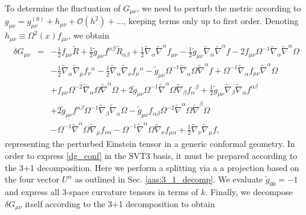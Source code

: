 To determine the fluctuation of $G_{\mu\nu}$, we need to perturb the metric according to $g_{\mu\nu} = g^{(0)}_{\mu\nu} + h_{\mu\nu} + \mathcal O(h^2)+ ...$, keeping terms only up to first order. Denoting $h_{\mu\nu} \equiv \Omega^2(x) f_{\mu\nu}$, we obtain
\begin{eqnarray}
\delta  G_{\mu\nu}&=& - \tfrac{1}{2} f_{\mu \nu } \tilde R + \tfrac{1}{2} \tilde g_{\mu \nu } f^{\alpha \beta } \tilde R_{\alpha \beta } + \tfrac{1}{2} \tilde\nabla_{\alpha }\tilde\nabla^{\alpha }f_{\mu \nu } -  \tfrac{1}{2} \tilde g_{\mu \nu } \tilde\nabla_{\alpha }\tilde\nabla^{\alpha }f - 2 f_{\mu \nu } \Omega^{-1} \tilde\nabla_{\alpha }\tilde\nabla^{\alpha }\Omega 
\nonumber\\
&&-  \tfrac{1}{2} \tilde\nabla_{\alpha }\tilde\nabla_{\mu }f_{\nu }{}^{\alpha }-  \tfrac{1}{2} \tilde\nabla_{\alpha }\tilde\nabla_{\nu }f_{\mu }{}^{\alpha } -  \tilde g_{\mu \nu } \Omega^{-1} \tilde\nabla_{\alpha }\Omega \tilde\nabla^{\alpha }f + \Omega^{-1} \tilde\nabla_{\alpha }f_{\mu \nu } \tilde\nabla^{\alpha }\Omega  
\nonumber\\
&&+ f_{\mu \nu } \Omega^{-2} \tilde\nabla_{\alpha }\Omega \tilde\nabla^{\alpha }\Omega  + 2 \tilde g_{\mu \nu } \Omega^{-1} \tilde\nabla^{\alpha }\Omega \tilde\nabla_{\beta }f_{\alpha }{}^{\beta } + \tfrac{1}{2} \tilde g_{\mu \nu } \tilde\nabla_{\beta }\tilde\nabla_{\alpha }f^{\alpha \beta }  
\nonumber\\
&&+ 2 \tilde g_{\mu \nu } f^{\alpha \beta } \Omega^{-1} \tilde\nabla_{\beta }\tilde\nabla_{\alpha }\Omega -  \tilde g_{\mu \nu } f_{\alpha \beta } \Omega^{-2} \tilde\nabla^{\alpha }\Omega \tilde\nabla^{\beta }\Omega \nonumber \\ 
&& -  \Omega^{-1} \tilde\nabla^{\alpha }\Omega \tilde\nabla_{\mu }f_{\nu \alpha } -  \Omega^{-1} \tilde\nabla^{\alpha }\Omega \tilde\nabla_{\nu }f_{\mu \alpha } + \tfrac{1}{2} \tilde\nabla_{\nu }\tilde\nabla_{\mu }f,
\label{dg_conf}
\end{eqnarray}
representing the perturbed Einstein tensor in a generic conformal geometry. In order to express \eqref{dg_conf} in the SVT3 basis, it must be prepared according to the 3+1 decomposition. Here we perform a splitting via a a projection based on the four vector $U^\alpha$ as outlined in Sec. \ref{aas:3_1_decomp}. We evaluate $\tilde g_{00} = -1$ and express all 3-space curvature tensors in terms of $k$. Finally, we decompose $\delta G_{\mu\nu}$ itself according to the 3+1 decomposition to obtain
